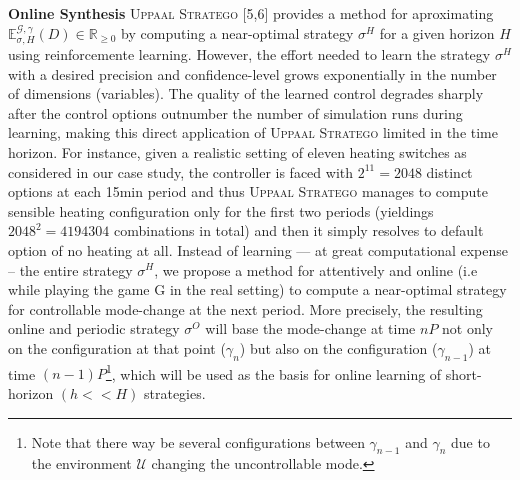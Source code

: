     \textbf{Online Synthesis}
    \textsc{Uppaal Stratego} [5,6] provides a method for aproximating 
    $\mathbb{E}^{\mathcal{G},\gamma}_{\sigma,H}(D) \in \mathbb{R}_{\geqslant 0}$
    by computing a near-optimal strategy $\sigma^H$ for a given horizon $H$ using 
    reinforcemente learning. However, the effort needed to learn the strategy 
    $\sigma^H$ with a desired precision and confidence-level grows exponentially
    in the number of dimensions (variables). The quality of the learned control 
    degrades sharply after the control options outnumber the number of simulation
    runs during learning, making this direct application of \textsc{Uppaal Stratego}
    limited in the time horizon. For instance, given a realistic setting of eleven 
    heating switches as considered in our case study, the controller is faced with  
    $2^11=2048$ distinct options at each 15min period and thus \textsc{Uppaal Stratego}
    manages to compute sensible heating configuration only for the first two periods 
    (yieldings $2048^2=4194304$ combinations in total) and then it simply resolves 
    to default option of no heating at all.
    Instead of learning --- at great computational expense -- the   entire strategy
    $\sigma^H$, we propose a method for attentively and online (i.e while playing
    the game \textsc{G} in the real setting) to compute a near-optimal strategy for 
    controllable mode-change at the next period. More precisely, the resulting online 
    and periodic strategy $\sigma^O$ will base the mode-change at time $nP$ not only
    on the configuration at that point ($\gamma_n$) but also on the configuration
    ($\gamma_{n-1}$) at time $(n-1)P$\footnote{Note that there way be several configurations
    between $\gamma_{n-1}$ and $\gamma_n$ due to the environment $\mathcal{U}$ changing
    the uncontrollable mode.}, which will be used as the basis for online
    learning of short-horizon $(h << H)$ strategies.

